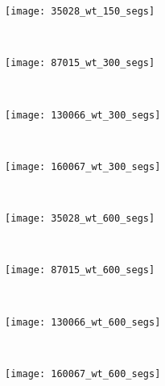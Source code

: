 \begin{figure}[!ht]
    \begin{subfigure}[t]{\textwidth+20pt\relax}
    	\texttt{[image: 35028\_wt\_150\_segs]} 
    \end{subfigure}      
    ~ %
    \begin{subfigure}[b]{0.2\textwidth}
        \texttt{[image: 87015\_wt\_300\_segs]}
    \end{subfigure}
    ~ %
    \begin{subfigure}[b]{0.2\textwidth}
        \texttt{[image: 130066\_wt\_300\_segs]}
    \end{subfigure}
    ~ %
    \begin{subfigure}[b]{0.2\textwidth}
        \texttt{[image: 160067\_wt\_300\_segs]}
    \end{subfigure} \\ [2ex]
    
    \begin{subfigure}[t]{\textwidth+20pt\relax}
    	\texttt{[image: 35028\_wt\_600\_segs]} 
    \end{subfigure}      
    ~ %
    \begin{subfigure}[b]{0.2\textwidth}
        \texttt{[image: 87015\_wt\_600\_segs]}
    \end{subfigure}
    ~ %
    \begin{subfigure}[b]{0.2\textwidth}
        \texttt{[image: 130066\_wt\_600\_segs]}
    \end{subfigure}
    ~ %
    \begin{subfigure}[b]{0.2\textwidth}
        \texttt{[image: 160067\_wt\_600\_segs]}
    \end{subfigure}     

	\caption{}\label{fig:wt_suprepixels}    
\end{figure}


